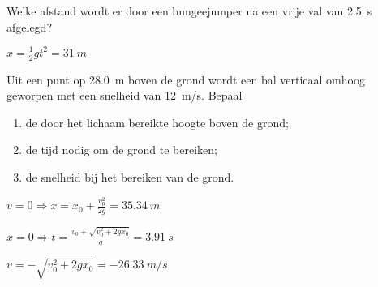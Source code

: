 \documentclass{ximera}
\begin{document}
	\author{Bart Lambregs}
    \xmsource\xmuitleg

\begin{exercise}
    Welke afstand wordt er door een bungeejumper na een vrije val van \SI{2,5}{s} afgelegd?
    \begin{oplossing}
        $x=\frac{1}{2}gt^2=\SI{31}{m}$
    \end{oplossing}
\end{exercise}

\begin{exercise}
    Uit een punt op \SI{28,0}{m} boven de grond wordt een bal verticaal omhoog geworpen met een snelheid van \SI{12}{m/s}. Bepaal
    \begin{enumerate}
        \item de door het lichaam bereikte hoogte boven de grond;
        \item de tijd nodig om de grond te bereiken;
        \item de snelheid bij het bereiken van de grond.
    \end{enumerate}
    \begin{oplossing}
        $v=0\Rightarrow x=x_0+\frac{v_0^2}{2g}=\SI{35,34}{m}$

        $x=0\Rightarrow t=\frac{v_0+\sqrt{v_0^2+2gx_0}}{g}=\SI{3,91}{s}$

        $v=-\sqrt{v_0^2+2gx_0}=\SI{-26,33}{m/s}$
    \end{oplossing}
\end{exercise}
\end{document}
